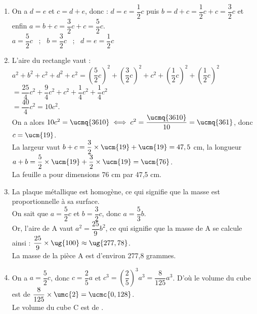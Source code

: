 \begin{corrige}
\ \\ [-5mm]
   \begin{enumerate}
      \item On a $d = e$  et $c = d+e$, donc : $d = e = \dfrac12c$ \; puis \; $b = d + c = \dfrac12c + c = \dfrac32c$ \; et enfin \; $a = b + c = \dfrac32c + c = \dfrac52c$. \\
         {\blue $a = \dfrac52c$ \, ; \, $b = \dfrac32c$ \, ; \, $d = e = \dfrac12c$} 
      \smallskip  
      \item L'aire du rectangle vaut : \\
         $a^2+b^2+c^2+d^2+e^2 =\left(\dfrac52c\right)^2+\left(\dfrac32c\right)^2+c^2+\left(\dfrac12c\right)^2+\left(\dfrac12c\right)^2$ \\ [1mm]
         \hspace*{3.05cm} $=\dfrac{25}{4}c^2+\dfrac94c^2+c^2+\dfrac14c^2+\dfrac14c^2$ \\ [1mm]
         \hspace*{3.05cm} $=\dfrac{40}{4}c^2=10c^2$. \\
         On a alors $10c^2 =\ucmq{3610} \iff c^2 =\dfrac{\ucmq{3610}}{10} =\ucmq{361}$, donc $c=\ucm{19}$. \\
         La largeur vaut $b+c =\dfrac32\times\ucm{19}+\ucm{19} = 47,5$ cm, la longueur $a+b =\dfrac52\times\ucm{19}+\dfrac32\times\ucm{19}= \ucm{76}$. \\ [1mm]
         {\blue La feuille a pour dimensions 76 cm par 47,5 cm.}
      \item La plaque métallique est homogène, ce qui signifie que la masse est proportionnelle à sa surface. \\
         On sait que $a=\dfrac52c$ et $b=\dfrac32c$, donc $a=\dfrac53b$. \\ [1mm]
         Or, l'aire de A vaut $a^2 =\dfrac{25}{9}b^2$, ce qui signifie que la masse de A se calcule ainsi : $\dfrac{25}{9}\times\ug{100} \approx\ug{277,78}$. \\ [1mm]
         {\blue La masse de la pièce A est d'environ 277,8 grammes.} 
      \item On a $a =\dfrac52c$, donc $c=\dfrac25a$ et $c^3=\left(\dfrac25\right)^3a^3 =\dfrac{8}{125}a^3$. D'où le volume du cube est de $\dfrac{8}{125}\times\umc{2} =\ucmc{0,128}$. \\ [1mm]
         {\blue Le volume du cube C est de .}
   \end{enumerate}
\end{corrige}

